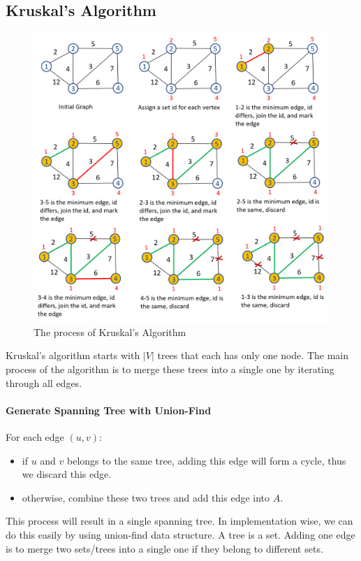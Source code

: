 \documentclass[../main.tex]{subfiles}
\begin{document}
\subsection{Kruskal's Algorithm}
  \begin{figure}[!ht]
     \centering
     \includegraphics[width=0.99\columnwidth]{fig/mst_kruskal.png}
     \caption{The process of Kruskal's Algorithm}
     \label{fig:prim_kruskal}
 \end{figure}
Kruskal's algorithm starts with $|V|$ trees that each has only one node. The main process of the algorithm is to merge these trees into a single one by iterating through all edges.

\paragraph{Generate Spanning Tree with Union-Find} For each edge $(u, v)$:
\begin{itemize}
    \item if $u$ and $v$ belongs to the same tree, adding this edge will form a cycle, thus we discard this edge.
    \item otherwise, combine these two trees and add this edge into $A$.
\end{itemize}
This process will result in a single spanning tree. In implementation wise,  we can do this easily by using union-find data structure. A tree is a set. Adding one edge is to merge two sets/trees into a single one if they belong to different sets. 
\end{document}
